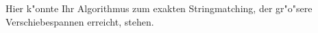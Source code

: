 \documentclass[12pt,a4paper]{scrartcl}
\begin{document}
Hier k"onnte Ihr Algorithmus zum exakten Stringmatching, der gr"o"sere
Verschiebespannen erreicht, stehen.
\end{document}

